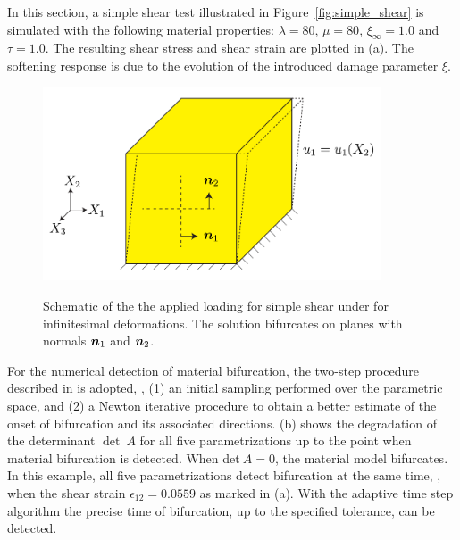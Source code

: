 \documentclass[12pt]{article}
\numberwithin{equation}{section}
\begin{document}
In this section, a simple shear test illustrated in Figure~\ref{fig:simple_shear} is simulated with the following
material properties: $\lambda = 80$, $\mu = 80$, $\xi_{\infty} = 1.0$
and $\tau = 1.0$. The resulting shear stress and shear strain are
plotted in (a). The softening response is
due to the evolution of the introduced damage parameter $\xi$.
\begin{figure}[!htbp]
  \begin{center}
      \includegraphics[width=100mm]{figs/simple_shear_schematic.pdf}
      \label{fig:simple_shear}
     \caption{Schematic of the the applied loading for simple shear under for infinitesimal deformations. The solution bifurcates on planes with normals ${\boldsymbol{n}}_{1}$ and ${\boldsymbol{n}}_{2}$.}
    \label{fig:parametrizations}
  \end{center}
\end{figure}

For the numerical detection of material bifurcation, the two-step
procedure described in  is adopted, \ie, (1) an
initial sampling performed over the parametric space, and (2) a Newton
iterative procedure to obtain a better estimate of the onset of
bifurcation and its associated directions.
(b) shows the degradation of the
determinant $\det~A$ for all five parametrizations up to the point
when material bifurcation is detected. When det$~A = 0$, the material
model bifurcates. In this example, all five parametrizations detect
bifurcation at the same time, \ie, when the shear strain
$\epsilon_{12}=0.0559$ as marked in 
(a). With the adaptive time step algorithm the precise time of
bifurcation, up to the specified tolerance, can be detected.
\end{document}
